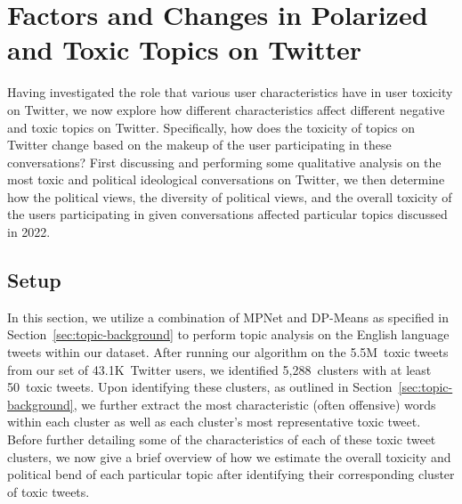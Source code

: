 \section{Factors and Changes in Polarized and Toxic Topics on Twitter}
Having investigated the role that various user characteristics have in user toxicity on Twitter, we now explore how different characteristics affect different negative and toxic topics on Twitter. Specifically, how does the toxicity of topics on Twitter change based on the makeup of the user participating in these conversations? First discussing and performing some qualitative analysis on the most toxic and political ideological conversations on Twitter, we then determine how the political views, the diversity of political views, and the overall toxicity of the users participating in given conversations affected particular topics discussed in 2022.

\subsection{Setup}
In this section, we utilize a combination of MPNet and DP-Means as specified in Section~\ref{sec:topic-background} to perform topic analysis on the English language tweets within our dataset. After running our algorithm on the 5.5M~toxic tweets from our set of 43.1K~Twitter users, we identified 5,288~clusters with at least 50~toxic tweets. Upon identifying these clusters, as outlined in Section~\ref{sec:topic-background}, we further extract the most characteristic (often offensive) words within each cluster as well as each cluster's most representative toxic tweet. Before further detailing some of the characteristics of each of these toxic tweet clusters, we now give a brief overview of how we estimate the overall toxicity and political bend of each particular topic after identifying their corresponding cluster of toxic tweets.

